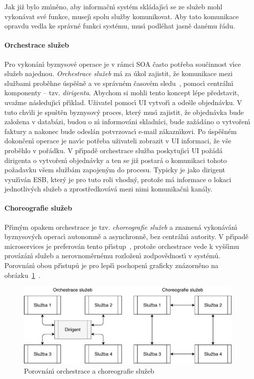 Jak již bylo zm\'{\i}něno, aby informačn\'{\i} systém skládaj\'{\i}c\'{\i} se ze služeb mohl vykonávat
své funkce, musej\'{\i} spolu služby komunikovat. Aby tato komunikace opravdu vedla
ke správné funkci systému, mus\'{\i} podléhat jasně danému řádu.

\paragraph{Orchestrace služeb}
Pro vykonán\'{\i} byznysové operace je v rámci \gls{SOA} často potřeba součinnost v\'{\i}ce služeb
najednou. \textit{Orchestrace služeb} má za úkol zajistit, že komunikace mezi službami
proběhne úspěšně a ve správném časovém sledu~\cite{orchestration},
pomoc\'{\i} centráln\'{\i} komponenty – tzv. \textit{dirigenta}.
Abychom si mohli tento koncept lépe představit, uvažme následuj\'{\i}c\'{\i} př\'{\i}klad. Uživatel
pomoc\'{\i} \gls{UI} vytvoř\'{\i} a odešle objednávku. V tuto chv\'{\i}li
je spuštěn byznysov\'y proces, kter\'y mus\'{\i} zajistit, že objednávka bude založena v databázi,
budou o n\'{\i} informováni skladn\'{\i}ci, bude zažádáno o vytvořen\'{\i} faktury a nakonec bude odeslán
potvrzovac\'{\i} e-mail zákazn\'{\i}kovi. Po úspěšném dokončen\'{\i} operace je nav\'{\i}c potřeba uživateli
zobrazit v \gls{UI} informaci, že vše proběhlo v pořádku. V př\'{\i}padě orchestrace služba
poskytuj\'{\i}c\'{\i} \gls{UI} požádá dirigenta o vytvořen\'{\i} objednávky a ten se již postará o
komunikaci tohoto požadavku všem službám zapojen\'ym do procesu.
Typicky je jako dirigent využ\'{\i}ván \gls{ESB}, kter\'y je pro tuto roli vhodn\'y,
protože má informace o lokaci jednotliv\'ych služeb a zprostředkovává mezi nimi
komunikačn\'{\i} kanály.

\paragraph{Choreografie služeb}
Př\'{\i}m\'ym opakem orchestrace je tzv. \textit{choreografie služeb} a znamená
vykonáván\'{\i} byznysov\'ych operac\'{\i} autonomně a asynchronně, bez centráln\'{\i}
autority. V př\'{\i}padě microservices je preferován tento př\'{\i}stup~\cite{dragoni2017microservices},
protože orchestrace vede k vyšš\'{\i}mu provázán\'{\i} služeb a nerovnoměrnému rozložen\'{\i}
zodpovědnost\'{\i} v systémů. Porovnán\'{\i} obou př\'{\i}stupů je pro lepš\'{\i} pochopen\'{\i} graficky
znázorněno na obrázku~\ref{fig:choreography-orchestration}~\cite{orchestrationvschoreography}.

\begin{figure}
    \centering
    \includegraphics[keepaspectratio=true, width=0.8\linewidth]{figures/choreography-orchestration.pdf}
    \caption{Porovnán\'{\i} orchestrace a choreografie služeb}
    \label{fig:choreography-orchestration}
\end{figure}

